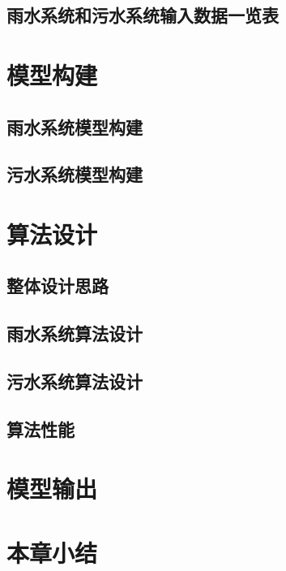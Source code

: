 \documentclass[degree=doctor]{sysuthesis}
\begin{document}
\clearpage
\setcounter{page}{78}
\subsection{雨水系统和污水系统输入数据一览表}

\clearpage
\setcounter{page}{79}
\section{模型构建}
\subsection{雨水系统模型构建}

\clearpage
\setcounter{page}{85}
\subsection{污水系统模型构建}

\clearpage
\setcounter{page}{91}
\section{算法设计}
\subsection{整体设计思路}
\subsection{雨水系统算法设计}

\clearpage
\setcounter{page}{99}
\subsection{污水系统算法设计}

\clearpage
\setcounter{page}{105}
\subsection{算法性能}

\clearpage
\setcounter{page}{107}
\section{模型输出}

\clearpage
\setcounter{page}{108}
\section{本章小结}
\end{document}
